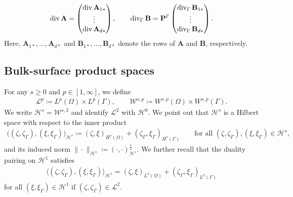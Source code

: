 \documentclass[11pt,reqno]{amsart}
\theoremstyle{remark}
\numberwithin{equation}{section}
\newcommand{\norm}[1]{\| #1 \|}
\newcommand{\scp}[2]{ \left( #1 , #2  \right)}
\newcommand{\Div}{\textnormal{div}}
\newcommand{\Divg}{\textnormal{div}_\Ga}
\newcommand{\Om}{\Omega}
\newcommand{\Ga}{\Gamma}
\begin{document}
\begin{align*}
    \Div\,\mathbf{A} = 
    \begin{pmatrix}
        \Div\, \mathbf{A}_{1\ast} \\ \vdots \\ \Div\, \mathbf{A}_{d\ast}
    \end{pmatrix},
    \qquad
    \Divg\,\mathbf{B} = \mathbf{P}^\Gamma
    \begin{pmatrix}
        \Divg\, \mathbf{B}_{1\ast} 
        \\ 
        \vdots 
        \\ \Divg\, \mathbf{B}_{d\ast}  
    \end{pmatrix}.
\end{align*}
Here, $\mathbf{A}_{1\ast},\ldots,\mathbf{A}_{d\ast}$ and $\mathbf{B}_{1\ast},\ldots,\mathbf{B}_{d\ast}$ denote the rows of $\mathbf{A}$ and $\mathbf{B}$, respectively.



\subsection{Bulk-surface product spaces}
For any $s\geq 0$ and $p\in[1,\infty]$, we define
\begin{align*}
	\mathcal{L}^p \coloneqq L^p(\Om)\times L^p(\Ga), \qquad \mathcal{W}^{s,p} \coloneqq W^{s,p}(\Om)\times W^{s,p}(\Ga).
\end{align*}
We write $\mathcal{H}^s = \mathcal{W}^{s,2}$ and identify $\mathcal{L}^2$ with $\mathcal{H}^0$. We point out that $\mathcal{H}^s$ is a Hilbert space with respect to the inner product
\begin{align*}
	\big((\zeta,\zeta_\Ga),(\xi,\xi_\Ga)\big)_{\mathcal{H}^s} \coloneqq (\zeta,\xi)_{H^s(\Om)} + (\zeta_\Ga,\xi_\Ga)_{H^s(\Ga)} \qquad\text{for all~}(\zeta,\zeta_\Ga),(\xi,\xi_\Ga)\in\mathcal{H}^s,
\end{align*}
and its induced norm $\norm{\cdot}_{\mathcal{H}^s} \coloneqq \scp{\cdot}{\cdot}_{\mathcal{H}^s}^{\frac12}$. We further recall that the duality pairing on $\mathcal{H}^1$ satisfies
\begin{align*}
	\big\langle(\zeta,\zeta_\Ga),(\xi,\xi_\Ga)\big\rangle_{\mathcal{H}^1} = (\zeta,\xi)_{L^2(\Om)} + (\zeta_\Ga,\xi_\Ga)_{L^2(\Ga)}
\end{align*}
for all $(\xi,\xi_\Ga)\in\mathcal{H}^1$ if $(\zeta,\zeta_\Ga)\in\mathcal{L}^2$. 
\end{document}
